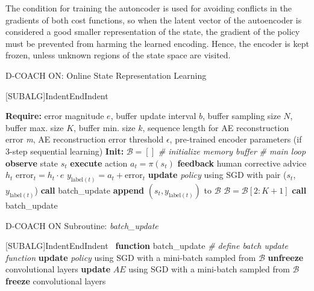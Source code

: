 The condition for training the autoncoder is used for avoiding conflicts in the gradients of both cost functions, so when the latent vector of the autoencoder is considered a good smaller representation of the state, the gradient of the policy must be prevented from harming the learned encoding. Hence, the encoder is kept frozen, unless unknown regions of the state space are visited. 

\begin{algorithm}[h]
\caption{D-COACH ON: Online State Representation Learning}\label{algorithm:EnDeepCOACH}
\begin{algorithmic}[1]
[SUBALG]{Indent}{EndIndent}{}{\algorithmicend\ }%

\State \textbf{Require:} error magnitude $\textit{e}$, buffer update interval $b$, buffer sampling size $N$, buffer max. size $K$, buffer min. size $k$, sequence length for AE reconstruction error \emph{m}, AE reconstruction error threshold $\epsilon$, pre-trained encoder parameters (if 3-step sequential learning) 
\State \textbf{Init:} $\mathcal{B} = []$ \emph{\# initialize memory buffer}
 \emph{\# main loop}
\State \textbf{observe} state $s_{t}$
\State \textbf{execute} action $a_{t}=\pi(s_{t})$
\State \textbf{feedback} human corrective advice $h_{t}$
\State $\mathrm{error}_{t} = h_{t}\cdot e$
\State $y_{\mathrm{label}(t)} = a_{t} + \mathrm{error}_{t}$ 
\State \textbf{update} \emph{policy} using SGD with pair ($s_{t}$, $y_{\mathrm{label}(t)}$) 
\State \textbf{call} batch\_update
\State \textbf{append} $(s_{t}, y_{\mathrm{label}(t)})$ to $\mathcal{B}$
\EndIf
{}
\State $\mathcal{B} = \mathcal{B}[2:K+1]$
\EndIf
{}
\State \textbf{call} batch\_update
\EndIf
\EndFor
\end{algorithmic}
\end{algorithm}

\begin{algorithm}[h]
\caption{D-COACH ON Subroutine: \emph{batch\_update}}\label{algorithm:batch_update}
\begin{algorithmic}[1]
[SUBALG]{Indent}{EndIndent}{}{\algorithmicend\ }%
\State \textbf{function} batch\_update \emph{\# define batch update function}
\Indent
{}
\State \textbf{update} \emph{policy} using SGD with a mini-batch sampled from $\mathcal{B}$
\State \textbf{unfreeze} convolutional layers
\State \textbf{update} $AE$ using SGD with a mini-batch sampled from $\mathcal{B}$
\Else
\State \textbf{freeze} convolutional layers
\EndIf
\EndIf
\EndIndent
\end{algorithmic}
\end{algorithm}

